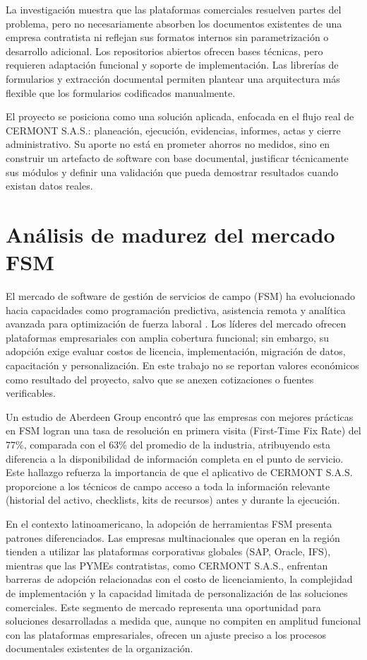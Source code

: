 La investigación muestra que las plataformas comerciales resuelven partes del problema, pero no necesariamente absorben los documentos existentes de una empresa contratista ni reflejan sus formatos internos sin parametrización o desarrollo adicional. Los repositorios abiertos ofrecen bases técnicas, pero requieren adaptación funcional y soporte de implementación. Las librerías de formularios y extracción documental permiten plantear una arquitectura más flexible que los formularios codificados manualmente.

El proyecto se posiciona como una solución aplicada, enfocada en el flujo real de CERMONT S.A.S.: planeación, ejecución, evidencias, informes, actas y cierre administrativo. Su aporte no está en prometer ahorros no medidos, sino en construir un artefacto de software con base documental, justificar técnicamente sus módulos y definir una validación que pueda demostrar resultados cuando existan datos reales.

\section{Análisis de madurez del mercado FSM}
\label{sec:madurez-fsm-mercado}

El mercado de software de gestión de servicios de campo (FSM) ha evolucionado hacia capacidades como programación predictiva, asistencia remota y analítica avanzada para optimización de fuerza laboral \cite{gartner2024}. Los líderes del mercado ofrecen plataformas empresariales con amplia cobertura funcional; sin embargo, su adopción exige evaluar costos de licencia, implementación, migración de datos, capacitación y personalización. En este trabajo no se reportan valores económicos como resultado del proyecto, salvo que se anexen cotizaciones o fuentes verificables.

Un estudio de Aberdeen Group \cite{aberdeen2019} encontró que las empresas con mejores prácticas en FSM logran una tasa de resolución en primera visita (First-Time Fix Rate) del 77\%, comparada con el 63\% del promedio de la industria, atribuyendo esta diferencia a la disponibilidad de información completa en el punto de servicio. Este hallazgo refuerza la importancia de que el aplicativo de CERMONT S.A.S. proporcione a los técnicos de campo acceso a toda la información relevante (historial del activo, checklists, kits de recursos) antes y durante la ejecución.

En el contexto latinoamericano, la adopción de herramientas FSM presenta patrones diferenciados. Las empresas multinacionales que operan en la región tienden a utilizar las plataformas corporativas globales (SAP, Oracle, IFS), mientras que las PYMEs contratistas, como CERMONT S.A.S., enfrentan barreras de adopción relacionadas con el costo de licenciamiento, la complejidad de implementación y la capacidad limitada de personalización de las soluciones comerciales. Este segmento de mercado representa una oportunidad para soluciones desarrolladas a medida que, aunque no compiten en amplitud funcional con las plataformas empresariales, ofrecen un ajuste preciso a los procesos documentales existentes de la organización.

